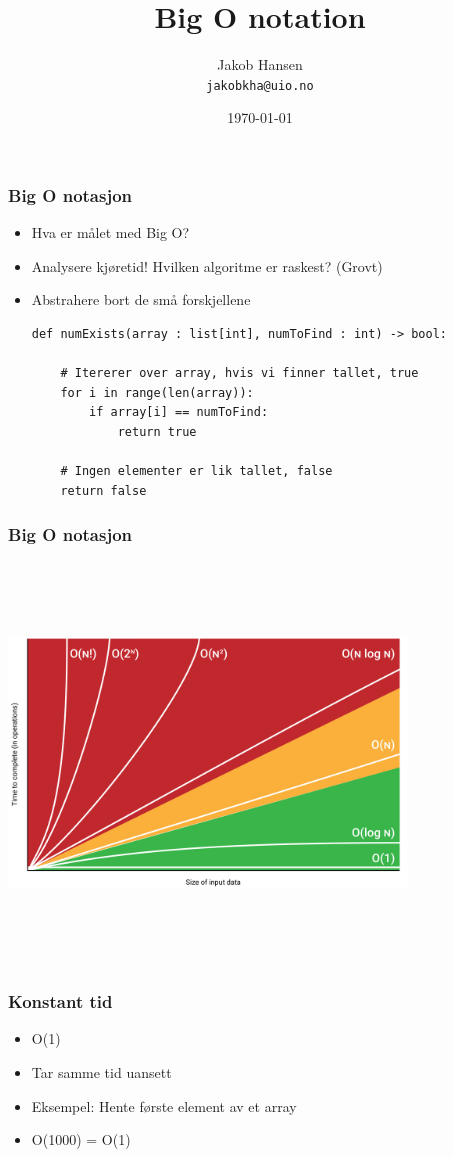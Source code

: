 \documentclass[norsk]{beamer}
\title{Big O notation}
\author{Jakob Hansen \\ \texttt{jakobkha@uio.no}}
\date{\today}
\begin{document}
	\frame{\titlepage}

    \begin{frame}[fragile]
        \frametitle{Big O notasjon}
        \begin{itemize}
            \item Hva er målet med Big O?
            \pause
        \item Analysere kjøretid! Hvilken algoritme er raskest? (Grovt)
        \pause
        \item Abstrahere bort de små forskjellene
        \pause
        \begin{lstlisting}[basicstyle=\scriptsize]
def numExists(array : list[int], numToFind : int) -> bool:

    # Itererer over array, hvis vi finner tallet, true
    for i in range(len(array)):
        if array[i] == numToFind:
            return true

    # Ingen elementer er lik tallet, false
    return false
		\end{lstlisting}
        \end{itemize}

    \end{frame}

    \begin{frame}
        \frametitle{Big O notasjon}
        \includegraphics[keepaspectratio, width=300pt, height=300pt]{big-o-chart.png}
    \end{frame}

    \begin{frame}
        \frametitle{Konstant tid}
        \begin{itemize}
            \item O(1)
            \item Tar samme tid uansett
            \item Eksempel: Hente første element av et array
            \item O(1000) = O(1)
        \end{itemize}
    \end{frame}
\end{document}
